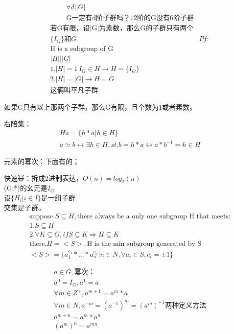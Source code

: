\documentclass[12pt, a4paper]{article}  %
\begin{document}
\begin{align}
    &\forall d||G|\\
    &\text{G一定有d阶子群吗？12阶的G没有6阶子群}
\end{align}
\begin{align}
    &\text{若G有限，设|G|为素数，那么G的子群只有两个}\\
    &\{I_G\}和G
    &Pf:\\
    &\text{H is a subgroup of G}\\
    &|H|||G|\\
    &1.|H|=1\,I_G\in H\rightarrow H=\{I_G\}\\
    &2.|H|=|G|\rightarrow H=G \\
    &\text{这俩叫平凡子群}
\end{align}

如果G只有以上那两个子群，那么G有限，且个数为1或者素数。

右陪集：
\begin{align}
    &Ha=\{h*a|h\in H\}\\
    &a \simeq b\leftrightarrow \exists h\in H,st. b=h*a \leftrightarrow a*b^{-1}=h\in H
\end{align}

元素的幂次：下面有的；

快速幂：拆成2进制表达，\(O(n)=log_2(n)\)\\

 

(G,*)的幺元是\(I_G\)\\
设\(\{H_i|i\in I\}\)是一组子群\\
交集是子群。
\begin{align}
    &\text{suppose }S \subseteq H,\text{there always be a only one subgroup H that meets:}\\
    &1. S\subseteq H\\
    &2.  \forall K \subseteq G,if S\subseteq K\Rightarrow H\subseteq K\\
    &\text{there,} H=<S>,\text{H is the min subgroup generated by S}\\
    &<S>=\{a_1^{c_1}*...*a_n^{c_n}| n\in N,\forall a_i\in S,c_i=\pm 1\}
\end{align}

\begin{align}
    &a\in G,\text{幂次：}\\
    &a^0=I_G,a^1=a\\
    &\forall m\in Z^{+},a^{m+1}=a^m*a\\
    &\forall m\in N,a^{-m}=(a^{-1})^m=(a^m)^{-1}\text{两种定义方法}\\
    &a^{m+n}=a^m*a^n\\
    &(a^m)^n=a^{mn}
\end{align}
\end{document}

